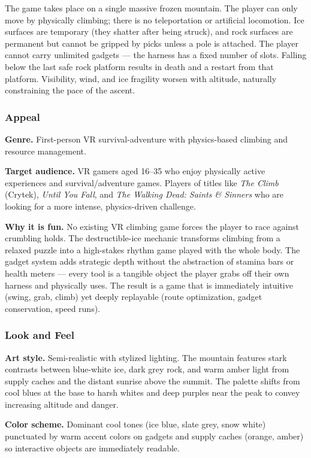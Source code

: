 \documentclass[12pt]{article}
\begin{document}
The game takes place on a single massive frozen mountain. The player can only move by physically climbing; there is no teleportation or artificial locomotion. Ice surfaces are temporary (they shatter after being struck), and rock surfaces are permanent but cannot be gripped by picks unless a pole is attached. The player cannot carry unlimited gadgets --- the harness has a fixed number of slots. Falling below the last safe rock platform results in death and a restart from that platform. Visibility, wind, and ice fragility worsen with altitude, naturally constraining the pace of the ascent.

\subsubsection{Appeal}

\textbf{Genre.} First-person VR survival-adventure with physics-based climbing and resource management.

\textbf{Target audience.} VR gamers aged 16--35 who enjoy physically active experiences and survival/adventure games. Players of titles like \textit{The Climb} (Crytek), \textit{Until You Fall}, and \textit{The Walking Dead: Saints \& Sinners} who are looking for a more intense, physics-driven challenge.

\textbf{Why it is fun.} No existing VR climbing game forces the player to race against crumbling holds. The destructible-ice mechanic transforms climbing from a relaxed puzzle into a high-stakes rhythm game played with the whole body. The gadget system adds strategic depth without the abstraction of stamina bars or health meters --- every tool is a tangible object the player grabs off their own harness and physically uses. The result is a game that is immediately intuitive (swing, grab, climb) yet deeply replayable (route optimization, gadget conservation, speed runs).

\subsubsection{Look and Feel}

\textbf{Art style.} Semi-realistic with stylized lighting. The mountain features stark contrasts between blue-white ice, dark grey rock, and warm amber light from supply caches and the distant sunrise above the summit. The palette shifts from cool blues at the base to harsh whites and deep purples near the peak to convey increasing altitude and danger.

\textbf{Color scheme.} Dominant cool tones (ice blue, slate grey, snow white) punctuated by warm accent colors on gadgets and supply caches (orange, amber) so interactive objects are immediately readable.
\end{document}
